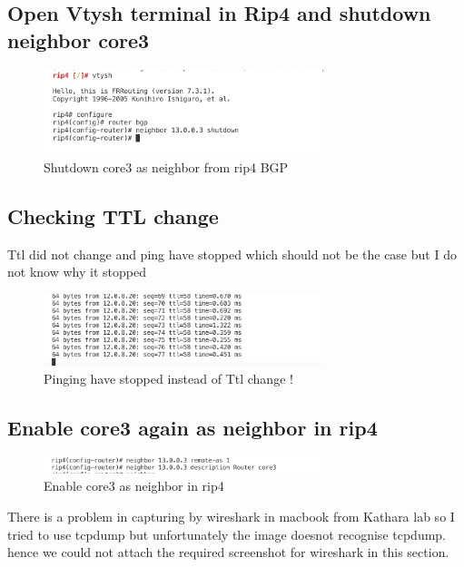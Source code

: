 \subsection{Open Vtysh terminal in Rip4 and shutdown neighbor core3 }
\begin{figure}[H]
\centering
  \includegraphics[width=0.73\textwidth]{Images/rip4ShutDownCore3.png}
  \caption{Shutdown core3 as neighbor from rip4 BGP}
  \label{fig:2.23}
\end{figure}
\subsection{Checking TTL change}
Ttl did not change and ping have stopped which should not be the case but I do not know why it stopped
\begin{figure}[H]
\centering
  \includegraphics[width=0.73\textwidth]{Images/wrongATT.png}
  \caption{Pinging have stopped instead of Ttl change !}
  \label{fig:2.24}
\end{figure}
\subsection{Enable core3 again as neighbor in rip4}
\begin{figure}[H]
\centering
  \includegraphics[width=0.73\textwidth]{Images/enableCor3Again.png}
  \caption{Enable core3 as neighbor in rip4}
  \label{fig:2.24}
\end{figure}
There is a problem in capturing by wireshark in macbook from Kathara lab so I tried to use tcpdump but unfortunately the image doesnot recognise tcpdump.
hence we could not attach the required screenshot for wireshark in this section.

